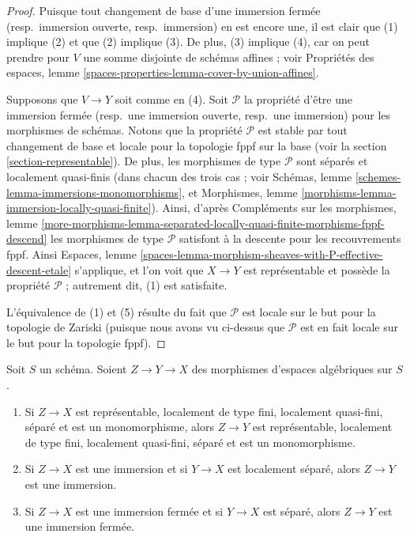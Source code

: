 \begin{proof}
Puisque tout changement de base d'une
immersion fermée (resp.\ immersion ouverte, resp.\ immersion)
en est encore une, il est clair que (1) implique (2) et que (2) implique (3).
De plus, (3) implique (4), car on peut prendre pour $V$ une somme disjointe de
schémas affines ; voir
Propriétés des espaces,
lemme \ref{spaces-properties-lemma-cover-by-union-affines}.

\medskip\noindent
Supposons que $V \to Y$ soit comme en (4).
Soit $\mathcal{P}$ la propriété d'être une
immersion fermée (resp.\ une immersion ouverte, resp.\ une immersion)
pour les morphismes de schémas. Notons que la propriété $\mathcal{P}$
est stable par tout changement de base et locale pour la topologie fppf sur la
base (voir la section \ref{section-representable}).
De plus, les morphismes de type $\mathcal{P}$ sont séparés et
localement quasi-finis (dans chacun des trois cas ; voir
Schémas, lemme \ref{schemes-lemma-immersions-monomorphisms}, et
Morphismes, lemme \ref{morphisms-lemma-immersion-locally-quasi-finite}).
Ainsi, d'après
Compléments sur les morphismes, lemme
\ref{more-morphisms-lemma-separated-locally-quasi-finite-morphisms-fppf-descend}
les morphismes de type $\mathcal{P}$ satisfont à la descente pour les recouvrements fppf. Ainsi
Espaces, lemme \ref{spaces-lemma-morphism-sheaves-with-P-effective-descent-etale}
s'applique, et l'on voit que $X \to Y$ est représentable et possède la propriété
$\mathcal{P}$ ; autrement dit, (1) est satisfaite.

\medskip\noindent
L'équivalence de (1) et (5) résulte du fait que
$\mathcal{P}$ est locale sur le but pour la topologie de Zariski (puisque nous avons vu
ci-dessus que $\mathcal{P}$ est en fait locale sur le but pour la topologie fppf).
\end{proof}

\begin{lemma}
\label{lemma-immersion-permanence}
Soit $S$ un schéma.
Soient $Z \to Y \to X$ des morphismes d'espaces algébriques sur $S$.
\begin{enumerate}
\item Si $Z \to X$ est représentable, localement de type fini, localement
quasi-fini, séparé et est un monomorphisme, alors $Z \to Y$ est
représentable, localement de type fini, localement quasi-fini,
séparé et est un monomorphisme.
\item Si $Z \to X$ est une immersion et si $Y \to X$ est localement séparé,
alors $Z \to Y$ est une immersion.
\item Si $Z \to X$ est une immersion fermée et si $Y \to X$ est séparé,
alors $Z \to Y$ est une immersion fermée.
\end{enumerate}
\end{lemma}

